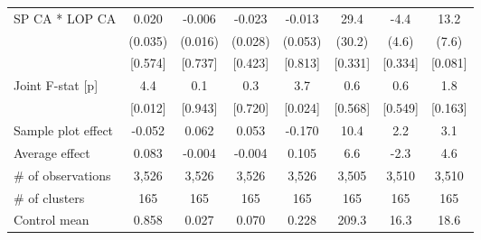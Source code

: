 \begin{tabular}{lccccccc}
SP CA * LOP CA & 0.020 & -0.006\hphantom{-} & -0.023\hphantom{-} & -0.013\hphantom{-} & 29.4 & -4.4\hphantom{-} & 13.2 \\
 & (0.035) & (0.016) & (0.028) & (0.053) & (30.2) & (4.6) & (7.6) \\
 & [0.574] & [0.737] & [0.423] & [0.813] & [0.331] & [0.334] & [0.081] \\
Joint F-stat [p] & 4.4 & 0.1 & 0.3 & 3.7 & 0.6 & 0.6 & 1.8 \\
 & [0.012] & [0.943] & [0.720] & [0.024] & [0.568] & [0.549] & [0.163] \\
\cmidrule(lr){1-8}
Sample plot effect & -0.052 & 0.062 & 0.053 & -0.170 & 10.4 & 2.2 & 3.1 \\
Average effect & 0.083 & -0.004 & -0.004 & 0.105 & 6.6 & -2.3 & 4.6 \\
\hline
\# of observations & 3,526 & 3,526 & 3,526 & 3,526 & 3,505 & 3,510 & 3,510 \\
\# of clusters & 165 & 165 & 165 & 165 & 165 & 165 & 165 \\
Control mean & 0.858 & 0.027 & 0.070 & 0.228 & 209.3 & 16.3 & 18.6 \\
\hline
\end{tabular}
